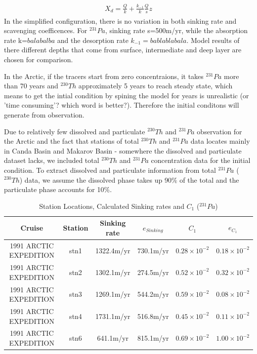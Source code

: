 \documentclass[paper=a4, fontsize=11pt]{scrartcl} %
\numberwithin{equation}{section} %
\numberwithin{figure}{section} %
\numberwithin{table}{section} %
\begin{document}
\begin{align}
\label{eq:sol2}
\begin{split}
X_{d} = \frac{Q}{k} + \frac {k_{-1}}{k}\frac{Q}{s}z
\end{split}
\end{align}
In the simplified configuration, there is no variation in both sinking rate and scavenging coefficences. For $^{231}Pa$, sinking rate s=500m/yr, while the absorption rate k=$balabalba$ and the desorption rate $k_{-1}=bablablabala$.   Model results of there different depths that come from surface, intermediate and deep layer are chosen for comparison.












In the Arctic, if the tracers start from zero concentraions, it takes $^{231}Pa$ more than 70 years and $^{230}Th$ approximately 5 years to reach steady state, which means to get the intial condition by spining the model for years is unrealistic (or 'time consuming'? which word is better?). Therefore the initial conditons will generate from observation.  

Due to relatively few dissolved and particulate $^{230}Th$ and $^{231}Pa$ observation for the Arctic and the fact that stations of total $^{230}Th$ and $^{231}Pa$ data locates mainly in Canda Basin and Makarov Basin - somewhere the dissolved and particulate dataset lacks, we included total $^{230}Th$ and $^{231}Pa$ concentration data for the initial condition. To extract dissolved and particulate information from total $^{231}Pa$ ($^{230}Th$) data, we assume the dissolved phase takes up 90$\%$ of the total and the particulate phase accounts for 10$\%$. 

\begin{table}[!h]
\caption{Station Locations, Calculated Sinking rates and $C_{1}$ ($^{231}Pa$) }%
\centering
\begin{tabular}{ |c|c|c|c|c|c|}
\hline
 Cruise &Station&Sinking rate&$e_{Sinking}$&$C_{1}$&$e_{C_{1}}$\\
\hline
 1991 ARCTIC EXPEDITION&stn1&1322.4m/yr&730.1m/yr&$0.28\times10^{-2}$&$0.18\times10^{-2}$\\
 1991 ARCTIC EXPEDITION&stn2&1302.1m/yr&274.5m/yr&$0.52\times10^{-2}$&$0.32\times10^{-2}$\\
 1991 ARCTIC EXPEDITION&stn3&1269.1m/yr&544.2m/yr&$0.59\times10^{-2}$&$0.08\times10^{-2}$\\
 1991 ARCTIC EXPEDITION&stn4&1731.1m/yr&516.8m/yr&$0.45\times10^{-2}$&$0.11\times10^{-2}$\\
 1991 ARCTIC EXPEDITION&stn6&641.1m/yr&815.1m/yr&$0.69\times10^{-2}$&$1.00\times10^{-2}$\\
\hline
\end{tabular}
\label{tab:2}
\end{table}
\end{document}
